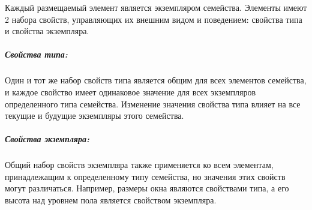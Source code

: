 Каждый размещаемый элемент является экземпляром семейства.
Элементы имеют 2 набора свойств, управляющих их внешним видом и поведением:
свойства типа и свойства экземпляра.%
\cite{DocRevit}

\subparagraph{Свойства типа:}

Один и тот же набор свойств типа является общим для всех элементов семейства,
и каждое свойство имеет одинаковое значение для всех экземпляров определенного типа семейства.
Изменение значения свойства типа влияет на все текущие и будущие экземпляры этого семейства.

\subparagraph{Свойства экземпляра:}

Общий набор свойств экземпляра также применяется ко всем элементам,
принадлежащим к определенному типу семейства,
но значения этих свойств могут различаться.
Например, размеры окна являются свойствами типа,
а его высота над уровнем пола является свойством экземпляра.

